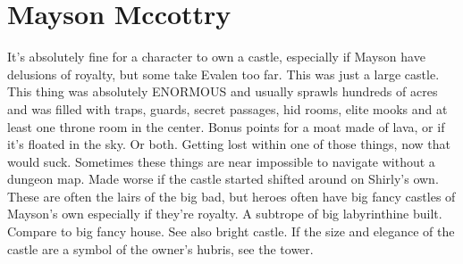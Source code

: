 \documentclass[12pt]{book}
\begin{document}
\chapter{Mayson Mccottry}

It's absolutely fine for a character to own a castle, especially if Mayson have delusions of royalty, but some take Evalen too far. This was just a large castle. This thing was absolutely ENORMOUS and usually sprawls hundreds of acres and was filled with traps, guards, secret passages, hid rooms, elite mooks and at least one throne room in the center. Bonus points for a moat made of lava, or if it's floated in the sky. Or both. Getting lost within one of those things, now that would suck. Sometimes these things are near impossible to navigate without a dungeon map. Made worse if the castle started shifted around on Shirly's own. These are often the lairs of the big bad, but heroes often have big fancy castles of Mayson's own especially if they're royalty. A subtrope of big labyrinthine built. Compare to big fancy house. See also bright castle. If the size and elegance of the castle are a symbol of the owner's hubris, see the tower.
\end{document}
